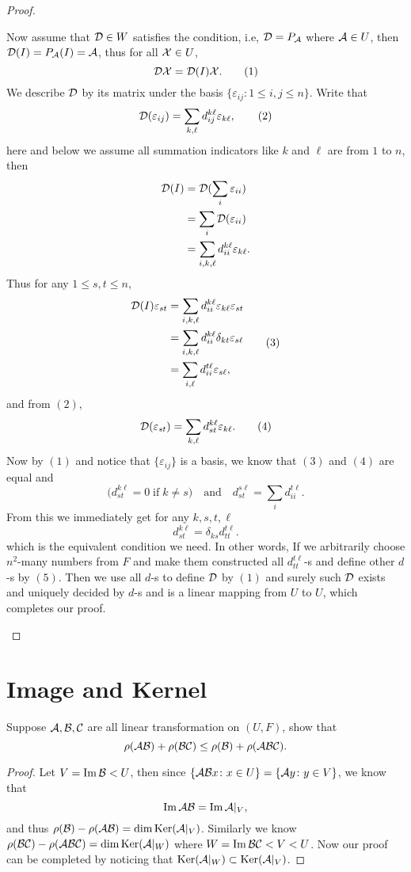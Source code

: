 \begin{proof}
\begin{description}
	Now assume that $\mathcal{D}\in W$ satisfies the condition, i.e, $\mathcal{D}=P_{\mathcal{A}}$ where $\mathcal{A}\in U$, then 
	$\mathcal{D}(I)=P_{\mathcal{A}}(I)=\mathcal{A}$, thus for all $\mathcal{X}\in U$,
	\[\mathcal{D}\mathcal{X}=\mathcal{D}(I)\mathcal{X}.\tag{1}\]
	We describe $\mathcal{D}$ by its matrix under the basis $\{\varepsilon_{ij}\colon 1\leq i,j\leq n\}$. Write that 
	\[\mathcal{D}(\varepsilon_{ij})=\sum_{k,\ell} d_{ij}^{k\ell} \varepsilon_{k\ell},\tag{2}\]
	here and below we assume all summation indicators like $k$ and $\ell$ are from $1$ to $n$, then
	\begin{align*}
	\mathcal{D}(I)&=\mathcal{D}(\sum_i \varepsilon_{ii})\\
			 &=\sum_i \mathcal{D}(\varepsilon_{ii})\\
			 &=\sum_{i,k,\ell} d_{ii}^{k\ell} \varepsilon_{k\ell}.
	\end{align*}
	Thus for any $1\leq s,t\leq n$,
	\[
	\begin{aligned}
	\mathcal{D}(I)\varepsilon_{st}&=\sum_{i,k,\ell} d_{ii}^{k\ell} \varepsilon_{k\ell} \varepsilon_{st}\\
					 &=\sum_{i,k,\ell} d_{ii}^{k\ell} \delta_{kt} \varepsilon_{s\ell}\\
					 &=\sum_{i,\ell} d_{ii}^{t\ell} \varepsilon_{s\ell},
	\end{aligned}\tag{3}
	\]
	and from $(2)$, 
	\[\mathcal{D}(\varepsilon_{st})=\sum_{k,\ell} d_{st}^{k\ell} \varepsilon_{k\ell}.\tag{4}\]
	Now by $(1)$ and notice that $\{\varepsilon_{ij}\}$ is a basis, we know that $(3)$ and $(4)$ are equal and 
	\[\big(d_{st}^{k\ell}=0\;\mbox{if}\;k\neq s\big)\quad\mbox{and}\quad d_{st}^{s\ell}=\sum_{i} d_{ii}^{t\ell}.\]
	From this we immediately get for any $k,s,t,\ell$
	\[d_{st}^{k\ell}=\delta_{ks} d_{tt}^{t\ell}.\tag{5}\]
	which is the equivalent condition we need. In other words, If we arbitrarily choose $n^2$-many numbers from $F$ and make them constructed all $d_{tt}^{t\ell}$-s and define other $d$-s by $(5)$. Then we use all $d$-s to define $\mathcal{D}$ by $(1)$ and surely such $\mathcal{D}$ exists and uniquely decided by $d$-s and is a linear mapping from $U$ to $U$, which completes our proof.
	\end{description}
\end{proof}

\section{Image and Kernel}

\begin{pro}%
	Suppose $\mathcal{A},\mathcal{B},\mathcal{C}$ are all linear transformation on $(U,F)$, show that
	\[\rho(\mathcal{AB})+\rho(\mathcal{BC})\leq \rho(\mathcal{B})+\rho(\mathcal{ABC}).\]
\end{pro}
\begin{proof}
	Let $V=\operatorname*{Im}\mathcal{B}<U$, then since $\{\mathcal{AB}x\colon x\in U\}=\{\mathcal{A}y\colon y\in V\}$, we know that
	\[\operatorname*{Im}\mathcal{AB}=\operatorname*{Im} \mathcal{A}|_{V},\]
	and thus $\rho(\mathcal{B})-\rho(\mathcal{AB})=\dim\operatorname*{Ker}(\mathcal{A}|_V)$. Similarly we know $\rho(\mathcal{BC})-\rho(\mathcal{ABC})=\dim\operatorname*{Ker}(\mathcal{A}|_W)$
	where $W=\operatorname*{Im}\mathcal{BC}<V<U$. Now our proof can be completed by noticing that $\operatorname*{Ker}(\mathcal{A}|_W)\subset \operatorname*{Ker}(\mathcal{A}|_V)$.
\end{proof}

